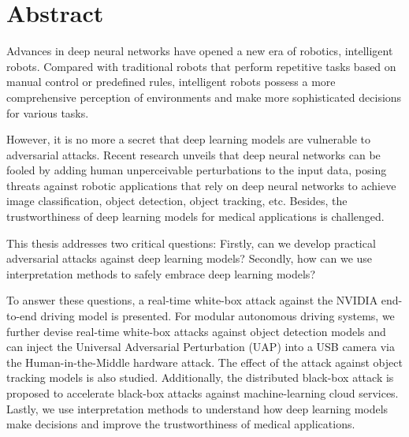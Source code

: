 \chapter*{Abstract}

Advances in deep neural networks have opened a new era of robotics, intelligent robots. Compared with traditional robots that perform repetitive tasks based on manual control or predefined rules, intelligent robots possess a more comprehensive perception of environments and make more sophisticated decisions for various tasks.
 
However, it is no more a secret that deep learning models are vulnerable to adversarial attacks. Recent research unveils that deep neural networks can be fooled by adding human unperceivable perturbations to the input data, posing threats against robotic applications that rely on deep neural networks to achieve image classification, object detection, object tracking, etc. Besides, the trustworthiness of deep learning models for medical applications is challenged.

This thesis addresses two critical questions: Firstly, can we develop practical adversarial attacks against deep learning models? Secondly, how can we use interpretation methods to safely embrace deep learning models?

To answer these questions, a real-time white-box attack against the NVIDIA end-to-end driving model is presented. For modular autonomous driving systems, we further devise real-time white-box attacks against object detection models and can inject the Universal Adversarial Perturbation (UAP) into a USB camera via the Human-in-the-Middle hardware attack. The effect of the attack against object tracking models is also studied. Additionally, the distributed black-box attack is proposed to accelerate black-box attacks against machine-learning cloud services. Lastly, we use interpretation methods to understand how deep learning models make decisions and improve the trustworthiness of medical applications.


